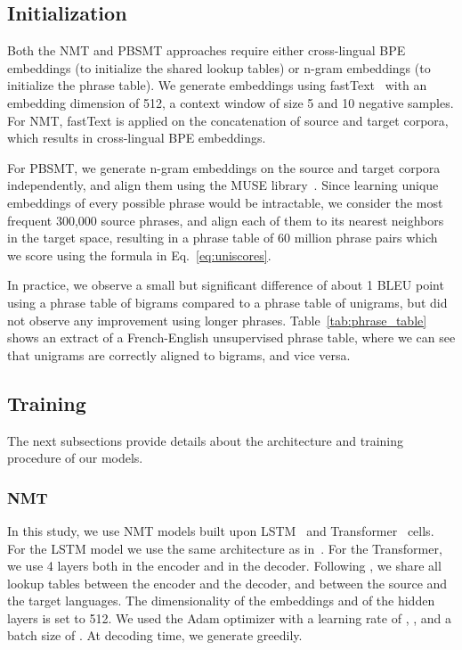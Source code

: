 \documentclass[11pt,a4paper]{article}
\begin{document}
\insertphrasetable
\subsection{Initialization} \label{sec:exper_init}
Both the NMT and PBSMT approaches require either cross-lingual BPE embeddings (to initialize the shared lookup tables) or n-gram embeddings (to initialize the phrase table). We generate embeddings using fastText~\cite{bojanowski2016enriching} with an embedding dimension of 512, a context window of size 5 and 10 negative samples. For NMT, fastText is applied on the concatenation of source and target corpora, which results in cross-lingual BPE embeddings.

For PBSMT, we generate n-gram embeddings on the source and target corpora independently, and align them using the MUSE library~\cite{wordalign17}.
Since learning unique embeddings of every possible phrase would be intractable, we consider the most frequent 300,000 source phrases, and align each of them to its  nearest neighbors in the target space, resulting in a phrase table of 60 million phrase pairs which we score using the formula in Eq.~\ref{eq:uniscores}. 

In practice, we observe a small but significant difference of about 1 BLEU point using a phrase table of bigrams compared to a phrase table of unigrams, but did not observe any improvement using longer phrases. Table~\ref{tab:phrase_table} shows an extract of a French-English unsupervised phrase table, where we can see that unigrams are correctly aligned to bigrams, and vice versa.

\subsection{Training}

The next subsections provide details about the architecture and training procedure of our models.

\subsubsection{NMT}
In this study, we use NMT models built upon LSTM~\cite{hochreiter1997long} and Transformer~\cite{vaswani2017attention} cells.
For the LSTM model we use the same architecture as in~\citet{unsupNMTlample}. For the Transformer, we use 4 layers both in the encoder and in the decoder. Following \citet{press2016using}, we share all lookup tables between the encoder and the decoder, and between the source and the target languages. The dimensionality of the embeddings and of the hidden layers is set to 512. We used the Adam optimizer \cite{kingma2014adam} with a learning rate of , , and a batch size of . At decoding time, we generate greedily.
\end{document}
